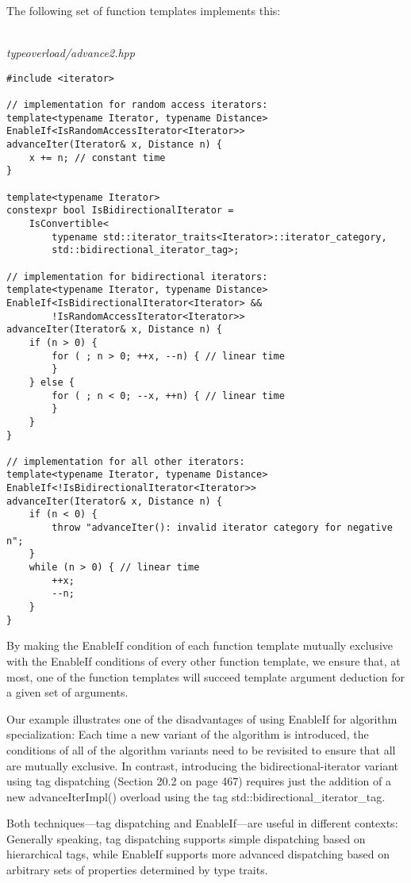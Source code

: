 The following set of function templates implements this:

\hspace*{\fill} \\ %
\noindent
\textit{typeoverload/advance2.hpp}
\begin{lstlisting}[style=styleCXX]
#include <iterator>

// implementation for random access iterators:
template<typename Iterator, typename Distance>
EnableIf<IsRandomAccessIterator<Iterator>>
advanceIter(Iterator& x, Distance n) {
	x += n; // constant time
}

template<typename Iterator>
constexpr bool IsBidirectionalIterator =
	IsConvertible<
		typename std::iterator_traits<Iterator>::iterator_category,
		std::bidirectional_iterator_tag>;

// implementation for bidirectional iterators:
template<typename Iterator, typename Distance>
EnableIf<IsBidirectionalIterator<Iterator> &&
		!IsRandomAccessIterator<Iterator>>
advanceIter(Iterator& x, Distance n) {
	if (n > 0) {
		for ( ; n > 0; ++x, --n) { // linear time
		}
	} else {
		for ( ; n < 0; --x, ++n) { // linear time
		}
	}
}

// implementation for all other iterators:
template<typename Iterator, typename Distance>
EnableIf<!IsBidirectionalIterator<Iterator>>
advanceIter(Iterator& x, Distance n) {
	if (n < 0) {
		throw "advanceIter(): invalid iterator category for negative n";
	}
	while (n > 0) { // linear time
		++x;
		--n;
	}
}
\end{lstlisting}

By making the EnableIf condition of each function template mutually exclusive with the EnableIf conditions of every other function template, we ensure that, at most, one of the function templates will succeed template argument deduction for a given set of arguments.

Our example illustrates one of the disadvantages of using EnableIf for algorithm specialization: Each time a new variant of the algorithm is introduced, the conditions of all of the algorithm variants need to be revisited to ensure that all are mutually exclusive. In contrast, introducing the bidirectional-iterator variant using tag dispatching (Section 20.2 on page 467) requires just the addition of a new advanceIterImpl() overload using the tag std::bidirectional\_iterator\_tag.

Both techniques—tag dispatching and EnableIf—are useful in different contexts: Generally speaking, tag dispatching supports simple dispatching based on hierarchical tags, while EnableIf supports more advanced dispatching based on arbitrary sets of properties determined by type traits.


